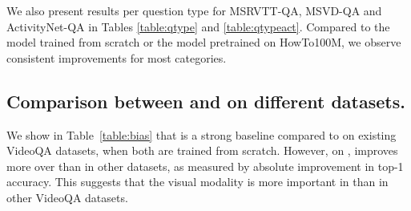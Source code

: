 We also present results per question type for MSRVTT-QA, MSVD-QA and ActivityNet-QA in Tables \ref{table:qtype} and \ref{table:qtypeact}. Compared to the model trained from scratch or the model pretrained on HowTo100M, we observe consistent improvements for most categories.

\subsection{Comparison between \textit{\qat{}} and \textit{\vqat{}} on different datasets.}\label{sec:bias}

We show in Table~\ref{table:bias} that \textit{\qat{}} is a strong baseline compared to \textit{\vqat{}} on existing VideoQA datasets, when both are trained from scratch.
However, on \smalldatasetname{}, \textit{\vqat{}} improves more over \textit{\qat{}} than in other datasets, as measured by absolute improvement in top-1 accuracy.
This suggests that the visual modality is more important in \smalldatasetname{} than in other VideoQA datasets.  